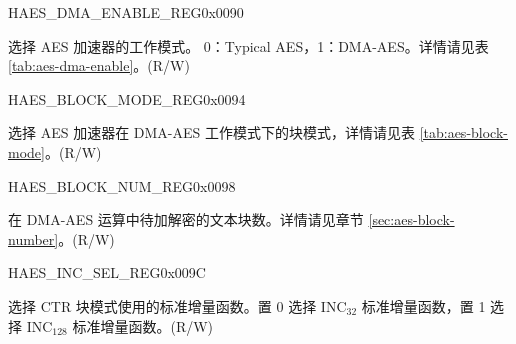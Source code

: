 \begin{register}{H}{AES\_DMA\_ENABLE\_REG}{0x{}0090}\label{regdesc:AESDMAENABLEREG}
%
%
\regnewline%
\begin{regdesc}\begin{reglist}
\item [AES\_DMA\_ENABLE] 选择 AES 加速器的工作模式。 0：Typical AES，1：DMA-AES。详情请见表 \ref{tab:aes-dma-enable}。(R/W)
\end{reglist}\end{regdesc}
\end{register}


\begin{register}{H}{AES\_BLOCK\_MODE\_REG}{0x{}0094}\label{regdesc:AESBLOCKMODEREG}
%
%
\regnewline%
\begin{regdesc}\begin{reglist}
\item [AES\_BLOCK\_MODE] 选择 AES 加速器在 DMA-AES 工作模式下的块模式，详情请见表 \ref{tab:aes-block-mode}。(R/W)
\end{reglist}\end{regdesc}
\end{register}


\begin{register}{H}{AES\_BLOCK\_NUM\_REG}{0x{}0098}\label{regdesc:AESBLOCKNUMREG}
%
\regnewline%
\begin{regdesc}\begin{reglist}
\item [AES\_BLOCK\_NUM] 在 DMA-AES 运算中待加解密的文本块数。详情请见章节 \ref{sec:aes-block-number}。(R/W)
\end{reglist}\end{regdesc}
\end{register}


\begin{register}{H}{AES\_INC\_SEL\_REG}{0x{}009C}\label{regdesc:AESINCSELREG}
%
%
\regnewline%
\begin{regdesc}\begin{reglist}
\item [AES\_INC\_SEL] 选择 CTR 块模式使用的标准增量函数。置 0 选择 INC$_{32}$ 标准增量函数，置 1 选择 INC$_{128}$ 标准增量函数。(R/W)
\end{reglist}\end{regdesc}
\end{register}

